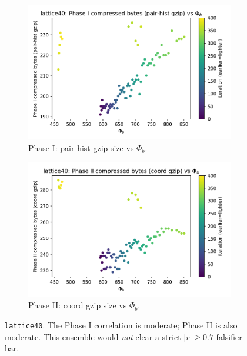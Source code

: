 \documentclass[11pt,a4paper]{article}
\numberwithin{equation}{section}
\newcommand{\phib}{\Phi_b}
\begin{document}
\begin{figure}[h!]
\centering
\begin{subfigure}[b]{0.48\textwidth}
\includegraphics[width=\textwidth]{figures/lattice40_phib_vs_phase1.png}
\caption{Phase I: pair-hist gzip size vs $\phib$.}
\end{subfigure}\hfill
\begin{subfigure}[b]{0.48\textwidth}
\includegraphics[width=\textwidth]{figures/lattice40_phib_vs_phase2.png}
\caption{Phase II: coord gzip size vs $\phib$.}
\end{subfigure}
\caption{\texttt{lattice40}. The Phase I correlation is moderate; Phase II is also moderate. This ensemble would \emph{not} clear a strict $|r|\ge 0.7$ falsifier bar.}
\label{fig:lattice40_corr}
\end{figure}
\end{document}
